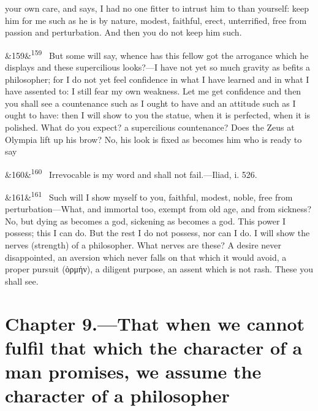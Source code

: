 \documentclass[12pt]{article}
\newcommand{\para}[1][]{\par\noindent\ifx&#1&\else\textsuperscript{\footnotesize #1}~\fi}
\begin{document}
your own care, and says, I had no one fitter to intrust him to than yourself: keep him for me such as he is by nature, modest, faithful, erect, unterrified, free from passion and perturbation. And then you do not keep him such.

\para[159] But some will say, whence has this fellow got the arrogance which he displays and these supercilious looks?—I have not yet so much gravity as befits a philosopher; for I do not yet feel confidence in what I have learned and in what I have assented to: I still fear my own weakness. Let me get confidence and then you shall see a countenance such as I ought to have and an attitude such as I ought to have: then I will show to you the statue, when it is perfected, when it is polished. What do you expect? a supercilious countenance? Does the Zeus at Olympia lift up his brow? No, his look is fixed as becomes him who is ready to say

\para[160] Irrevocable is my word and shall not fail.—Iliad, i. 526.

\para[161] Such will I show myself to you, faithful, modest, noble, free from perturbation—What, and immortal too, exempt from old age, and from sickness? No, but dying as becomes a god, sickening as becomes a god. This power I possess; this I can do. But the rest I do not possess, nor can I do. I will show the nerves (strength) of a philosopher. What nerves are these? A desire never disappointed, an aversion which never falls on that which it would avoid, a proper pursuit (ὁρμήν), a diligent purpose, an assent which is not rash. These you shall see.

\section*{Chapter 9.---That when we cannot fulfil that which the character of a man promises, we assume the character of a philosopher}
\end{document}
